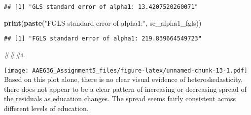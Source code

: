 \documentclass[
]{article}
\newenvironment{Shaded}{\begin{snugshade}}{\end{snugshade}}
\newcommand{\AttributeTok}[1]{\textcolor[rgb]{0.13,0.29,0.53}{#1}}
\newcommand{\CommentTok}[1]{\textcolor[rgb]{0.56,0.35,0.01}{\textit{#1}}}
\newcommand{\DecValTok}[1]{\textcolor[rgb]{0.00,0.00,0.81}{#1}}
\newcommand{\FunctionTok}[1]{\textcolor[rgb]{0.13,0.29,0.53}{\textbf{#1}}}
\newcommand{\NormalTok}[1]{#1}
\newcommand{\OtherTok}[1]{\textcolor[rgb]{0.56,0.35,0.01}{#1}}
\newcommand{\SpecialCharTok}[1]{\textcolor[rgb]{0.81,0.36,0.00}{\textbf{#1}}}
\newcommand{\StringTok}[1]{\textcolor[rgb]{0.31,0.60,0.02}{#1}}
\begin{document}
\begin{verbatim}
## [1] "GLS standard error of alpha1: 13.4207520260071"
\end{verbatim}

\begin{Shaded}
\begin{Highlighting}[]
\FunctionTok{print}\NormalTok{(}\FunctionTok{paste}\NormalTok{(}\StringTok{"FGLS standard error of alpha1:"}\NormalTok{, se\_alpha1\_fgls))}
\end{Highlighting}
\end{Shaded}

\begin{verbatim}
## [1] "FGLS standard error of alpha1: 219.839664549723"
\end{verbatim}

\#\#\#i.

\begin{Shaded}
\end{Shaded}

\texttt{[image: AAE636\_Assignment5\_files/figure-latex/unnamed-chunk-13-1.pdf]}
Based on this plot alone, there is no clear visual evidence of
heteroskedasticity, there does not appear to be a clear pattern of
increasing or decreasing spread of the residuals as education changes.
The spread seems fairly consistent across different levels of education.
\end{document}
